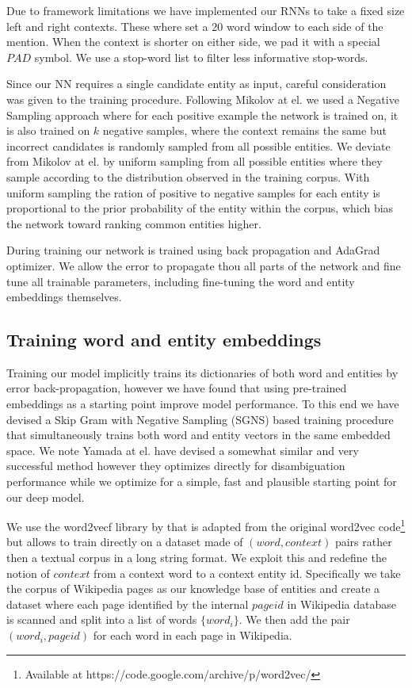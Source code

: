 \documentclass[11pt]{article}
\begin{document}
Due to framework limitations we have implemented our RNNs to take a fixed size left and right contexts. These where set a 20 word window to each side of the mention. When the context is shorter on either side, we pad it with a special $PAD$ symbol. We use a stop-word list to filter less informative stop-words.

Since our NN requires a single candidate entity as input, careful consideration was given to the training procedure. Following Mikolov at el. \cite{mikolov2013distributed} we used a Negative Sampling approach where for each positive example the network is trained on, it is also trained on $k$ negative samples, where the context remains the same but incorrect candidates is randomly sampled from all possible entities. We deviate from Mikolov at el. by uniform sampling from all possible entities where they sample according to the distribution observed in the training corpus. With uniform sampling the ration of positive to negative samples for each entity is proportional to the prior probability of the entity within the corpus, which bias the network toward ranking common entities higher.

During training our network is trained using back propagation and AdaGrad optimizer\cite{duchi2011adaptive}. We allow the error to propagate thou all parts of the network and fine tune all trainable parameters, including fine-tuning the word and entity embeddings themselves.

\subsection{Training word and entity embeddings}

Training our model implicitly trains its dictionaries of both word and entities by error back-propagation, however we have found that using pre-trained embeddings as a starting point improve model performance. To this end we have devised a Skip Gram with Negative Sampling (SGNS) \cite{mikolov2013distributed} based training procedure that simultaneously trains both word and entity vectors in the same embedded space. We note Yamada at el. \cite{yamada2016joint} have devised a somewhat similar and very successful method however they optimizes directly for disambiguation performance while we optimize for a simple, fast and plausible starting point for our deep model.

We use the word2vecf library by \cite{levy2014dependency} that is adapted from the original word2vec code\footnote{Available at https://code.google.com/archive/p/word2vec/} but allows to train directly on a dataset made of $(word,context)$ pairs rather then a textual corpus in a long string format. We exploit this and redefine the notion of $context$ from a context word to a context entity id. Specifically we take the corpus of Wikipedia pages as our knowledge base of entities and create a dataset where each page identified by the internal $pageid$ in Wikipedia database is scanned and split into a list of words $\{word_i\}$. We then add the pair $(word_i,pageid)$ for each word in each page in Wikipedia.
\end{document}
